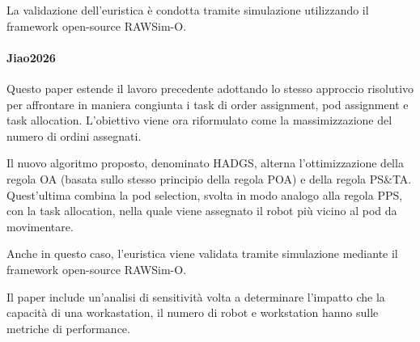 \documentclass{article}
\begin{document}
La validazione dell'euristica è condotta tramite simulazione utilizzando il framework open-source RAWSim-O.



\paragraph{Jiao2026 \cite{Jiao2026}}
Questo paper estende il lavoro precedente adottando lo stesso approccio risolutivo per affrontare in maniera congiunta i task di order assignment, pod assignment e task allocation. L'obiettivo viene ora riformulato come la massimizzazione del numero di ordini assegnati.

Il nuovo algoritmo proposto, denominato HADGS, alterna l'ottimizzazione della regola OA (basata sullo stesso principio della regola POA) e della regola PS\&TA. Quest'ultima combina la pod selection, svolta in modo analogo alla regola PPS, con la task allocation, nella quale viene assegnato il robot più vicino al pod da movimentare.

Anche in questo caso, l'euristica viene validata tramite simulazione mediante il framework open-source RAWSim-O.

Il paper include un'analisi di sensitività volta a determinare l'impatto che la capacità di una workastation, il numero di robot e workstation hanno sulle metriche di performance.



\newpage
\printbibliography
\end{document}

